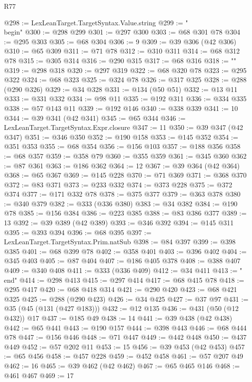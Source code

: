 \begin{lexlean}{R77}
\begin{coremodule}
@298 := LexLeanTarget.TargetSyntax.Value.string
@299 := "\\begin{"
@300 := @298 @299
@301 := @297 @300
@303 := @68 @301 @78
@304 := @295 @303
@305 := @68 @304
@306 := 9
@309 := @39 @306 (@42 @306)
@310 := @65 @309
@311 := @71 @78
@312 := @310 @311
@314 := @68 @312 @78
@315 := @305 @314
@316 := @290 @315
@317 := @68 @316
@318 := "}"
@319 := @298 @318
@320 := @297 @319
@322 := @68 @320 @78
@323 := @295 @322
@324 := @68 @323
@325 := @324 @78
@326 := @317 @325
@328 := @288 (@290 @326)
@329 := @34 @328
@331 := @134 (@50 @51)
@332 := @13 @11
@333 := @331 @332
@334 := @98 @11
@335 := @192 @311
@336 := @334 @335
@338 := @57 @143 @11
@339 := @192 @146
@340 := @338 @339
@341 := 10
@344 := @39 @341 (@42 @341)
@345 := @65 @344
@346 := LexLeanTarget.TargetSyntax.Expr.closure
@347 := 11
@350 := @39 @347 (@42 @347)
@351 := @346 @350
@352 := @190 @158
@353 := @145 @352
@354 := @351 @353
@355 := @68 @354
@356 := @156 @103
@357 := @188 @356
@358 := @68 @357
@359 := @358 @79
@360 := @355 @359
@361 := @345 @360
@362 := @87 @361
@363 := @186 @362
@364 := 12
@367 := @39 @364 (@42 @364)
@368 := @65 @367
@369 := @145 @228
@370 := @71 @369
@371 := @368 @370
@372 := @83 @371
@373 := @233 @332
@374 := @373 @228
@375 := @372 @374
@377 := @171 @332 @78
@378 := @375 @377
@379 := @363 @378
@380 := @340 @379
@382 := @333 (@336 @380)
@383 := @34 @382
@384 := @190 @78
@385 := @156 @384
@386 := @223 @385
@388 := @83 @386 @377
@389 := 13
@392 := @39 @389 (@42 @389)
@393 := @346 @392
@394 := @145 @311
@395 := @393 @394
@396 := @68 @395
@397 := LexLeanTarget.TargetSyntax.Prim.natSub
@398 := @84 @397
@399 := @398 @385
@401 := @68 @399 @78
@402 := @358 @401
@403 := @396 @402
@404 := @345 @403
@405 := @87 @404
@407 := @186 @405 @378
@408 := @388 @407
@409 := @340 @408
@411 := @333 (@336 @409)
@412 := @34 @411
@413 := "\\end{"
@414 := @298 @413
@415 := @297 @414
@417 := @68 @415 @78
@418 := @295 @417
@420 := @68 @418 @314
@421 := @290 @420
@423 := @68 @421 @325
@425 := @288 (@290 @423)
@426 := @34 @425
@427 := @37 @97
@431 := @35 (@45 (@131 (@427 @183)))
@432 := @12 @135
@436 := @431 (@50 (@12 @432)) @17
@437 := @185 @49
@438 := 14
@441 := @39 @438 (@42 @438)
@442 := @65 @441
@443 := @190 @157
@444 := @398 @443
@446 := @68 @444 @78
@447 := @156 @446
@448 := @71 @447
@449 := @442 @448
@450 := @437 @449
@452 := @57 @202 @11
@453 := 15
@456 := @39 @453 (@42 @453)
@457 := @65 @456
@458 := @457 @228
@459 := @452 @458
@461 := @57 @207 @49
@462 := 16
@465 := @39 @462 (@42 @462)
@467 := @65 @465 @146
@468 := @461 @467
@469 := 17
}
\end{coremodule}
\end{lexlean}
